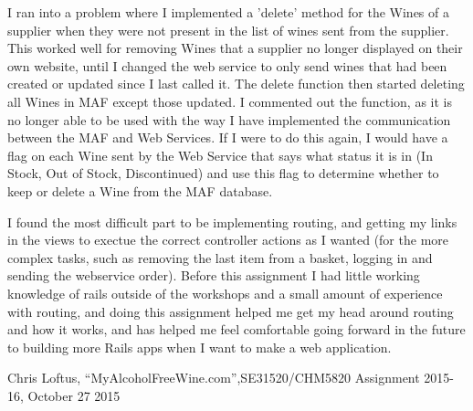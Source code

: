 \documentclass[12pt]{article}
\begin{document}
I ran into a problem where I implemented a 'delete' method for the Wines of a supplier when they were not present in the list of wines sent from the supplier. This worked well for removing Wines that a supplier no longer displayed on their own website, until I changed the web service to only send wines that had been created or updated since I last called it. The delete function then started deleting all Wines in MAF except those updated. I commented out the function, as it is no longer able to be used with the way I have implemented the communication between the MAF and Web Services. If I were to do this again, I would have a flag on each Wine sent by the Web Service that says what status it is in (In Stock, Out of Stock, Discontinued) and use this flag to determine whether to keep or delete a Wine from the MAF database.

I found the most difficult part to be implementing routing, and getting my links in the views to exectue the correct controller actions as I wanted (for the more complex tasks, such as removing the last item from a basket, logging in and sending the webservice order). Before this assignment I had little working knowledge of rails outside of the workshops and a small amount of experience with routing, and doing this assignment helped me get my head around routing and how it works, and has helped me feel comfortable going forward in the future to building more Rails apps when I want to make a web application. 



\clearpage


\begin{thebibliography}{5}

 Chris Loftus, ``MyAlcoholFreeWine.com'',SE31520/CHM5820 Assignment 2015-16, October 27 2015


\end{thebibliography}
\end{document}
